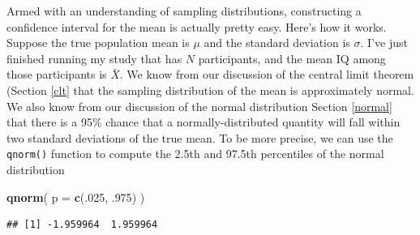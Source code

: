 \documentclass[spanish,]{book}
\newenvironment{Shaded}{\begin{snugshade}}{\end{snugshade}}
\newcommand{\KeywordTok}[1]{\textcolor[rgb]{0.13,0.29,0.53}{\textbf{#1}}}
\newcommand{\DataTypeTok}[1]{\textcolor[rgb]{0.13,0.29,0.53}{#1}}
\newcommand{\DecValTok}[1]{\textcolor[rgb]{0.00,0.00,0.81}{#1}}
\newcommand{\NormalTok}[1]{#1}
\begin{document}
Armed with an understanding of sampling distributions, constructing a
confidence interval for the mean is actually pretty easy. Here's how it
works. Suppose the true population mean is \(\mu\) and the standard
deviation is \(\sigma\). I've just finished running my study that has
\(N\) participants, and the mean IQ among those participants is
\(\bar{X}\). We know from our discussion of the central limit theorem
(Section \ref{clt} that the sampling distribution of the mean is
approximately normal. We also know from our discussion of the normal
distribution Section \ref{normal} that there is a 95\% chance that a
normally-distributed quantity will fall within two standard deviations
of the true mean. To be more precise, we can use the \texttt{qnorm()}
function to compute the 2.5th and 97.5th percentiles of the normal
distribution

\begin{Shaded}
\begin{Highlighting}[]
\KeywordTok{qnorm}\NormalTok{( }\DataTypeTok{p =} \KeywordTok{c}\NormalTok{(.}\DecValTok{025}\NormalTok{, .}\DecValTok{975}\NormalTok{) )}
\end{Highlighting}
\end{Shaded}

\begin{verbatim}
## [1] -1.959964  1.959964
\end{verbatim}
\end{document}
